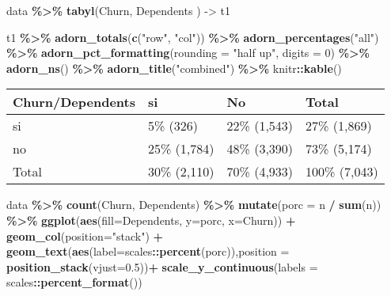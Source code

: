 \documentclass[
]{article}
\newenvironment{Shaded}{\begin{snugshade}}{\end{snugshade}}
\newcommand{\AttributeTok}[1]{\textcolor[rgb]{0.13,0.29,0.53}{#1}}
\newcommand{\DecValTok}[1]{\textcolor[rgb]{0.00,0.00,0.81}{#1}}
\newcommand{\FloatTok}[1]{\textcolor[rgb]{0.00,0.00,0.81}{#1}}
\newcommand{\FunctionTok}[1]{\textcolor[rgb]{0.13,0.29,0.53}{\textbf{#1}}}
\newcommand{\NormalTok}[1]{#1}
\newcommand{\OtherTok}[1]{\textcolor[rgb]{0.56,0.35,0.01}{#1}}
\newcommand{\SpecialCharTok}[1]{\textcolor[rgb]{0.81,0.36,0.00}{\textbf{#1}}}
\newcommand{\StringTok}[1]{\textcolor[rgb]{0.31,0.60,0.02}{#1}}
\begin{document}
\begin{Shaded}
\begin{Highlighting}[]
\NormalTok{data }\SpecialCharTok{\%\textgreater{}\%} \FunctionTok{tabyl}\NormalTok{(Churn, Dependents ) }\OtherTok{{-}\textgreater{}}\NormalTok{ t1}

\NormalTok{t1 }\SpecialCharTok{\%\textgreater{}\%} \FunctionTok{adorn\_totals}\NormalTok{(}\FunctionTok{c}\NormalTok{(}\StringTok{"row"}\NormalTok{, }\StringTok{"col"}\NormalTok{)) }\SpecialCharTok{\%\textgreater{}\%} \FunctionTok{adorn\_percentages}\NormalTok{(}\StringTok{"all"}\NormalTok{) }\SpecialCharTok{\%\textgreater{}\%}
\FunctionTok{adorn\_pct\_formatting}\NormalTok{(}\AttributeTok{rounding =} \StringTok{"half up"}\NormalTok{, }\AttributeTok{digits =} \DecValTok{0}\NormalTok{) }\SpecialCharTok{\%\textgreater{}\%} \FunctionTok{adorn\_ns}\NormalTok{() }\SpecialCharTok{\%\textgreater{}\%}
  \FunctionTok{adorn\_title}\NormalTok{(}\StringTok{"combined"}\NormalTok{) }\SpecialCharTok{\%\textgreater{}\%}\NormalTok{ knitr}\SpecialCharTok{::}\FunctionTok{kable}\NormalTok{()}
\end{Highlighting}
\end{Shaded}

\begin{longtable}[]{@{}llll@{}}
\toprule\noalign{}
Churn/Dependents & si & No & Total \\
\midrule\noalign{}
\endhead
\bottomrule\noalign{}
\endlastfoot
si & 5\% (326) & 22\% (1,543) & 27\% (1,869) \\
no & 25\% (1,784) & 48\% (3,390) & 73\% (5,174) \\
Total & 30\% (2,110) & 70\% (4,933) & 100\% (7,043) \\
\end{longtable}

\begin{Shaded}
\begin{Highlighting}[]
\NormalTok{data }\SpecialCharTok{\%\textgreater{}\%} \FunctionTok{count}\NormalTok{(Churn, Dependents) }\SpecialCharTok{\%\textgreater{}\%}
  \FunctionTok{mutate}\NormalTok{(}\AttributeTok{porc =}\NormalTok{ n }\SpecialCharTok{/} \FunctionTok{sum}\NormalTok{(n)) }\SpecialCharTok{\%\textgreater{}\%} 
  \FunctionTok{ggplot}\NormalTok{(}\FunctionTok{aes}\NormalTok{(}\AttributeTok{fill=}\NormalTok{Dependents, }\AttributeTok{y=}\NormalTok{porc, }\AttributeTok{x=}\NormalTok{Churn)) }\SpecialCharTok{+} 
    \FunctionTok{geom\_col}\NormalTok{(}\AttributeTok{position=}\StringTok{"stack"}\NormalTok{) }\SpecialCharTok{+}
    \FunctionTok{geom\_text}\NormalTok{(}\FunctionTok{aes}\NormalTok{(}\AttributeTok{label=}\NormalTok{scales}\SpecialCharTok{::}\FunctionTok{percent}\NormalTok{(porc)),}\AttributeTok{position =} \FunctionTok{position\_stack}\NormalTok{(}\AttributeTok{vjust=}\FloatTok{0.5}\NormalTok{))}\SpecialCharTok{+}
  \FunctionTok{scale\_y\_continuous}\NormalTok{(}\AttributeTok{labels =}\NormalTok{ scales}\SpecialCharTok{::}\FunctionTok{percent\_format}\NormalTok{()) }
\end{Highlighting}
\end{Shaded}
\end{document}
